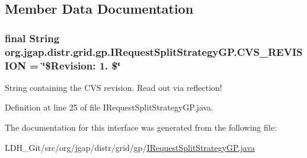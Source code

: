 \subsection{Member Data Documentation}
\hypertarget{interfaceorg_1_1jgap_1_1distr_1_1grid_1_1gp_1_1_i_request_split_strategy_g_p_a13409b797f93bc094b310ed9c65ce6d2}{
\subsubsection[{C\-V\-S\-\_\-\-R\-E\-V\-I\-S\-I\-O\-N}]{\setlength{\rightskip}{0pt plus 5cm}final String org.\-jgap.\-distr.\-grid.\-gp.\-I\-Request\-Split\-Strategy\-G\-P.\-C\-V\-S\-\_\-\-R\-E\-V\-I\-S\-I\-O\-N = \char`\"{}\$Revision\-: 1. \$\char`\"{}\hspace{0.3cm}{\ttfamily [static]}}}\label{interfaceorg_1_1jgap_1_1distr_1_1grid_1_1gp_1_1_i_request_split_strategy_g_p_a13409b797f93bc094b310ed9c65ce6d2}
String containing the C\-V\-S revision. Read out via reflection! 

Definition at line 25 of file I\-Request\-Split\-Strategy\-G\-P.\-java.



The documentation for this interface was generated from the following file\-:\begin{DoxyCompactItemize}
\item 
L\-D\-H\-\_\-\-Git/src/org/jgap/distr/grid/gp/\hyperlink{_i_request_split_strategy_g_p_8java}{I\-Request\-Split\-Strategy\-G\-P.\-java}\end{DoxyCompactItemize}
